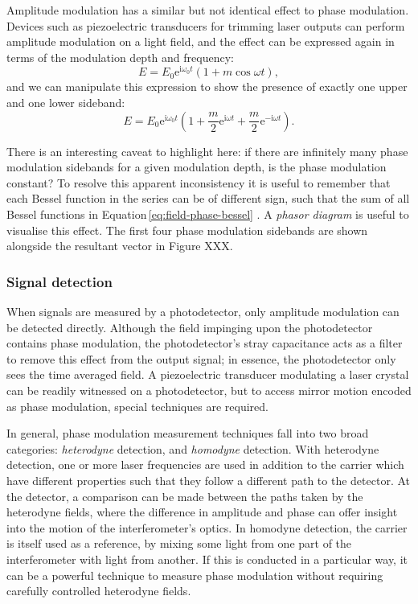 Amplitude modulation has a similar but not identical effect to phase modulation. Devices such as piezoelectric transducers for trimming laser outputs can perform amplitude modulation on a light field, and the effect can be expressed again in terms of the modulation depth and frequency:
\begin{equation}
  E = E_0 \text{e}^{\text{i} \omega_0 t} \left( 1 + m \cos{\omega t} \right),
\end{equation}
and we can manipulate this expression to show the presence of exactly one upper and one lower sideband:
\begin{equation}
  \label{eq:field-amp-mod}
  E = E_0 \text{e}^{\text{i} \omega_0 t} \left( 1 + \frac{m}{2} \text{e}^{\text{i} \omega t} + \frac{m}{2} \text{e}^{-\text{i} \omega t} \right).
\end{equation}

There is an interesting caveat to highlight here: if there are infinitely many phase modulation sidebands for a given modulation depth, is the phase modulation constant? To resolve this apparent inconsistency it is useful to remember that each Bessel function in the series can be of different sign, such that the sum of all Bessel functions in Equation\,\ref{eq:field-phase-bessel} . A \emph{phasor diagram} is useful to visualise this effect. The first four phase modulation sidebands are shown alongside the resultant vector in Figure XXX.


\subsubsection{Signal detection}
When signals are measured by a photodetector, only amplitude modulation can be detected directly. Although the field impinging upon the photodetector contains phase modulation, the photodetector's stray capacitance acts as a filter to remove this effect from the output signal; in essence, the photodetector only sees the time averaged field. A piezoelectric transducer modulating a laser crystal can be readily witnessed on a photodetector, but to access mirror motion encoded as phase modulation, special techniques are required.

In general, phase modulation measurement techniques fall into two broad categories: \emph{heterodyne} detection, and \emph{homodyne} detection. With heterodyne detection, one or more laser frequencies are used in addition to the carrier which have different properties such that they follow a different path to the detector. At the detector, a comparison can be made between the paths taken by the heterodyne fields, where the difference in amplitude and phase can offer insight into the motion of the interferometer's optics. In homodyne detection, the carrier is itself used as a reference, by mixing some light from one part of the interferometer with light from another. If this is conducted in a particular way, it can be a powerful technique to measure phase modulation without requiring carefully controlled heterodyne fields.

